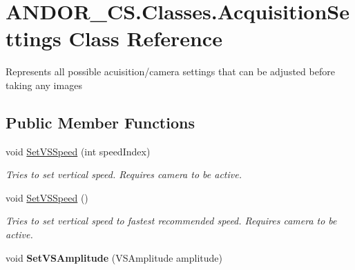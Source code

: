 \hypertarget{class_a_n_d_o_r___c_s_1_1_classes_1_1_acquisition_settings}{}\section{A\+N\+D\+O\+R\+\_\+\+C\+S.\+Classes.\+Acquisition\+Settings Class Reference}
\label{class_a_n_d_o_r___c_s_1_1_classes_1_1_acquisition_settings}


Represents all possible acuisition/camera settings that can be adjusted before taking any images  


\subsection*{Public Member Functions}
\begin{DoxyCompactItemize}
\item 
void \hyperlink{class_a_n_d_o_r___c_s_1_1_classes_1_1_acquisition_settings_a88ab97b728c2aff52ddc829a89361338}{Set\+V\+S\+Speed} (int speed\+Index)
\begin{DoxyCompactList}\small\item\em Tries to set vertical speed. Requires camera to be active. \end{DoxyCompactList}\item 
void \hyperlink{class_a_n_d_o_r___c_s_1_1_classes_1_1_acquisition_settings_ab1ac4389f9428ff05583d991968fba40}{Set\+V\+S\+Speed} ()
\begin{DoxyCompactList}\small\item\em Tries to set vertical speed to fastest recommended speed. Requires camera to be active. \end{DoxyCompactList}\item 
\mbox{\label{class_a_n_d_o_r___c_s_1_1_classes_1_1_acquisition_settings_ab82af52f7c589346b5dd06f7d6a9bef8}} 
void {\bfseries Set\+V\+S\+Amplitude} (V\+S\+Amplitude amplitude)
\end{DoxyCompactItemize}
